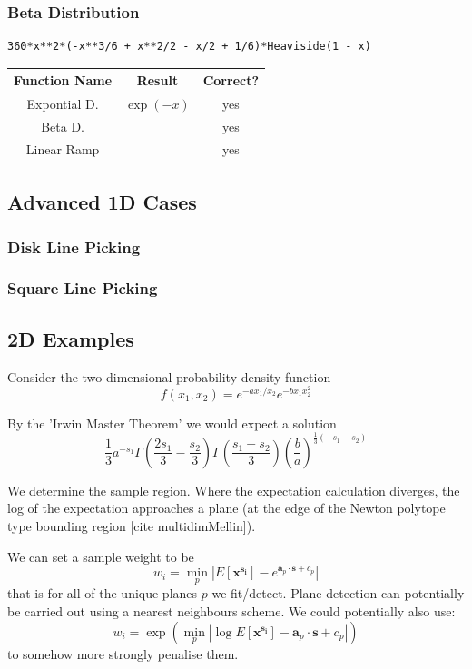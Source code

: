 \documentclass{article}
\begin{document}
\subsubsection{Beta Distribution}
\begin{verbatim}
360*x**2*(-x**3/6 + x**2/2 - x/2 + 1/6)*Heaviside(1 - x)
\end{verbatim}

\begin{tabular}{|c|c|c|}
\hline
Function Name & Result & Correct? \\
\hline
Expontial D. & $\exp(-x)$ & yes \\
Beta D. & & yes \\
Linear Ramp & & yes \\
\end{tabular}


\subsection{Advanced 1D Cases}

\subsubsection{Disk Line Picking}

\subsubsection{Square Line Picking}

\subsection{2D Examples}
Consider the two dimensional probability density function
$$
f(x_1,x_2) = e^{-a x_1/x_2}e^{-b x_1 x_2^2}
$$

By the 'Irwin Master Theorem' we would expect a solution
$$
 \frac{1}{3} a^{-s_1} \Gamma \left(\frac{2 s_1}{3}-\frac{s_2}{3}\right) \Gamma \left(\frac{s_1+s_2}{3}\right) \left(\frac{b}{a}\right)^{\frac{1}{3}
    (-s_1-s_2)}
$$

We determine the sample region. Where the expectation calculation diverges, the log of the expectation approaches a plane (at the edge of the Newton polytope type bounding region [cite multidimMellin]).

We can set a sample weight to be 
$$
w_i = \min_{p} |E[\mathbf{x^{s_i}}] - e^{\mathbf{a}_p \cdot \mathbf{s} + c_p}|
$$
that is for all of the unique planes $p$ we fit/detect. Plane detection can potentially be carried out using a nearest neighbours scheme. We could potentially also use:
$$
w_i = \exp\left(\min_{p} |\log E[\mathbf{x^{s_i}}] - \mathbf{a}_p \cdot \mathbf{s} + c_p| \right)
$$
to somehow more strongly penalise them.
\end{document}
